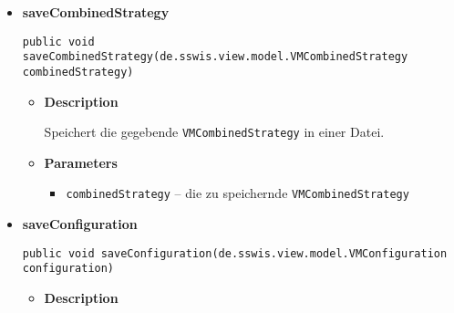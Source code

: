 {{{{{{\begin{itemize}
{\begin{itemize}
{Lädt das \texttt{\small VMResult} mit dem angegebenen Namen. Der Name entspricht der zugehörigen \texttt{\small Configuration} aus deren Simulation das Ergebnis entstanden ist.
}
\item{
{\bf  Parameters}
  \begin{itemize}
   \item{
\texttt{name} -- der Name des \texttt{\small VMResult}}
  \end{itemize}
}%
\item{{\bf  Returns} -- 
das \texttt{\small VMResult} mit dem angegebenen Namen 
}%
\end{itemize}
}%
\item{ 
\hypertarget{de.sswis.controller.FileManager.saveCombinedStrategy(de.sswis.view.model.VMCombinedStrategy)}{{\bf  saveCombinedStrategy}\\}
\begin{lstlisting}[frame=none]
public void saveCombinedStrategy(de.sswis.view.model.VMCombinedStrategy combinedStrategy)\end{lstlisting} %
\begin{itemize}
\item{
{\bf  Description}

Speichert die gegebende \texttt{\small VMCombinedStrategy} in einer Datei.
}
\item{
{\bf  Parameters}
  \begin{itemize}
   \item{
\texttt{combinedStrategy} -- die zu speichernde \texttt{\small VMCombinedStrategy}}
  \end{itemize}
}%
\end{itemize}
}%
\item{ 
\hypertarget{de.sswis.controller.FileManager.saveConfiguration(de.sswis.view.model.VMConfiguration)}{{\bf  saveConfiguration}\\}
\begin{lstlisting}[frame=none]
public void saveConfiguration(de.sswis.view.model.VMConfiguration configuration)\end{lstlisting} %
\begin{itemize}
\item{
{\bf  Description}

}
\end{itemize}}
\end{itemize}}}}}}}
